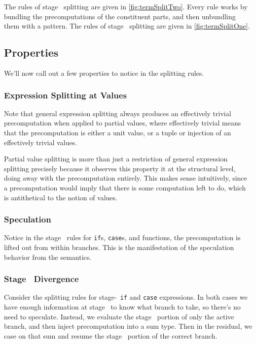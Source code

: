 The rules of stage \bbtwo\ splitting are given in \ref{fig:termSplitTwo}.  
Every rule works by bundling the precomputations of the constituent parts, and then unbundling them with a pattern.
The rules of stage \bbone\ splitting are given in \ref{fig:termSplitOne}.  

\subsection {Properties}

We'll now call out a few properties to notice in the splitting rules.

\subsubsection {Expression Splitting at Values}

Note that general expression splitting always produces an effectively trivial precomputation when applied to partial values,
where effectively trivial means that the precomputation is either a unit value, or a tuple or injection of an effectively trivial values.

Partial value splitting is more than just a restriction of general expression splitting 
precisely because it observes this property it at the structural level, doing away with the precomputation entirely.
This makes sense intuitively, since a precomputation would imply that there is some computation left to do, 
which is antithetical to the notion of values.

\subsubsection {Speculation}

Notice in the stage \bbtwo\ rules for {\tt if}s, {\tt case}s, and functions, the precomputation is lifted out from within branches.
This is the manifestation of the speculation behavior from the semantics.

\subsubsection {Stage \bbone\ Divergence}
Consider the splitting rules for stage-\bbone\ {\tt if} and {\tt case} expressions.
In both cases we have enough information at stage \bbone\ to know what branch to take, so there's no need to speculate.
Instead, we evaluate the stage \bbone\ portion of only the active branch, and then inject precomputation into a sum type.
Then in the residual, we case on that sum and resume the stage \bbtwo\ portion of the correct branch.

